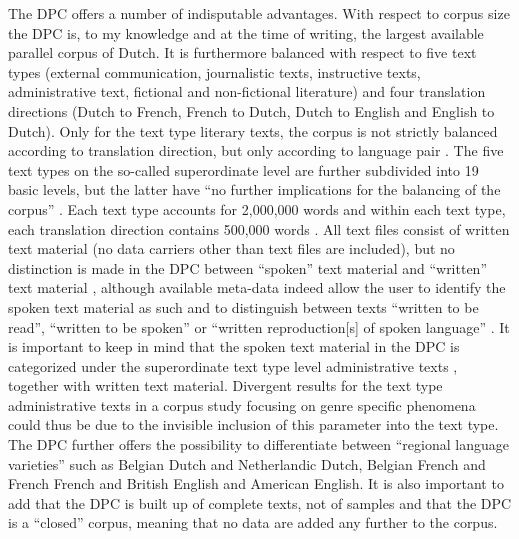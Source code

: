 The DPC offers a number of indisputable advantages. With respect to corpus size the DPC is, to my knowledge and at the time of writing, the largest available parallel corpus of Dutch. It is furthermore balanced with respect to five text types (external communication, journalistic texts, instructive texts, administrative text, fictional and non-fictional literature) and four translation directions (Dutch to French, French to Dutch, Dutch to English and English to Dutch). Only for the text type literary texts, the corpus is not strictly balanced according to translation direction, but only according to language pair \citep[187]{spyns_dutch_2013}. The five text types on the so-called superordinate level are further subdivided into 19 basic levels, but the latter have “no further implications for the balancing of the corpus” \citep[378]{macken_dutch_2011}. Each text type accounts for 2,000,000 words and within each text type, each translation direction contains 500,000 words \citep[376--378]{macken_dutch_2011}. All text files consist of written text material (no data carriers other than text files are included), but no distinction is made in the DPC between “spoken” text material and “written” text material \citep[59]{delaere_translations_2015}, although available meta-data indeed allow the user to identify the spoken text material as such and to distinguish between texts “written to be read”, “written to be spoken” or  “written reproduction[s] of spoken language” \citep[59]{delaere_translations_2015}. It is important to keep in mind that the spoken text material in the DPC is categorized under the superordinate text type level administrative texts \citep[59]{delaere_translations_2015}, together with written text material. Divergent results for the text type administrative texts in a corpus study focusing on genre specific phenomena could thus be due to the invisible inclusion of this parameter into the text type. The DPC further offers the possibility to differentiate between “regional language varieties” \citep[48]{delaere_translations_2015} such as Belgian Dutch and Netherlandic Dutch, Belgian French and French French and British English and American English. It is also important to add that the DPC is built up of complete texts, not of samples and that the DPC is a ``closed'' corpus, meaning that no data are added any further to the corpus.

